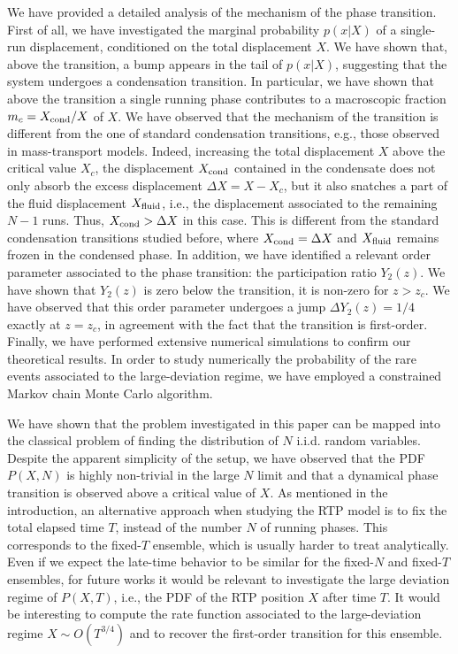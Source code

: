 \documentclass[aps,pre,twocolumn,superscriptaddress,showpacs]{revtex4-1}
\begin{document}
We have provided a detailed analysis of the mechanism of the phase
transition. First of all, we have investigated the marginal
probability $p(x|X)$ of a single-run displacement, conditioned on the
total displacement $X$. We have shown that, above the transition, a
bump appears in the tail of $p(x|X)$, suggesting that the system
undergoes a condensation transition. In particular, we have shown that
above the transition a single running phase contributes to a
macroscopic fraction $m_c=X_{\rm cond}/X$ of $X$. We have observed that the mechanism of the transition is different from the one of standard condensation transitions, e.g., those observed in mass-transport models. Indeed, increasing the total displacement $X$ above the critical value $X_c$, the displacement $X_{\rm cond}$ contained in the condensate does not only absorb the excess displacement $\Delta X=X-X_c$, but it also snatches a part of the fluid displacement $X_{\rm fluid}$, i.e., the displacement associated to the remaining $N-1$ runs. Thus, $X_{\rm cond}>\Delta X$ in this case. This is different from the standard condensation transitions studied before, where $X_{\rm cond}=\Delta X$ and $X_{\rm fluid}$ remains frozen in the condensed phase. In addition, we have identified a relevant
order parameter associated to the phase transition: the participation
ratio $Y_2(z)$. We have shown that $Y_2(z)$ is zero below the
transition,  it is non-zero for $z>z_c$. We have
observed that this order parameter undergoes a jump $\Delta Y_2(z)=1/4$ exactly at $z=z_c$, in agreement with the fact that the transition
is first-order. Finally, we have performed extensive numerical
simulations to confirm our theoretical results. In order to study
numerically the probability of the rare events associated to the
large-deviation regime, we have employed a constrained Markov chain Monte Carlo algorithm.


We have shown that the problem investigated in this paper can be
mapped into the classical problem of finding the distribution of $N$
i.i.d. random variables. Despite the apparent simplicity of the setup,
we have observed that the PDF $P(X,N)$ is highly non-trivial in the
large $N$ limit and that a dynamical phase transition is observed
above a critical value of $X$. As mentioned in the introduction, an
alternative approach when studying the RTP model is to fix the total
elapsed time $T$, instead of the number $N$ of running phases. This
corresponds to the fixed-$T$ ensemble, which is usually harder to
treat analytically. Even if we expect the late-time behavior to be
similar for the fixed-$N$ and fixed-$T$ ensembles, for future works it
would be relevant to investigate the large deviation regime of
$P(X,T)$, i.e., the PDF of the RTP position $X$ after time $T$. It
would be interesting to compute the rate function associated to the
large-deviation regime $X\sim O(T^{3/4})$ and to recover the
first-order transition for this ensemble.
\end{document}
